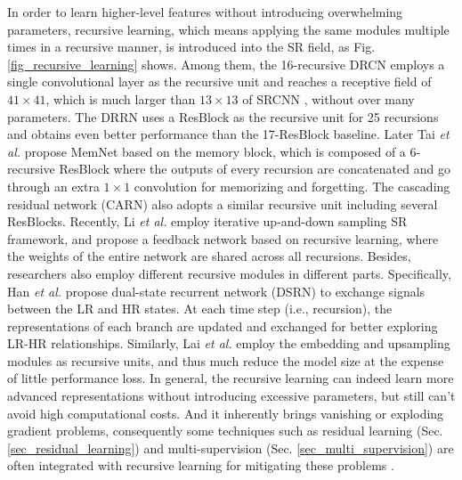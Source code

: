 {\label{sec_recursive_learning}
In order to learn higher-level features without introducing overwhelming parameters, recursive learning, which means applying the same modules multiple times in a recursive manner, is introduced into the SR field, as Fig. \ref{fig_recursive_learning} shows.
Among them, the 16-recursive DRCN employs a single convolutional layer as the recursive unit and reaches a receptive field of $41 \times 41$, which is much larger than $13 \times 13$ of SRCNN , without over many parameters.
The DRRN  uses a ResBlock  as the recursive unit for 25 recursions and obtains even better performance than the 17-ResBlock baseline.
Later Tai \textit{et al.}  propose MemNet based on the memory block, which is composed of a 6-recursive ResBlock where the outputs of every recursion are concatenated and go through an extra $1 \times 1$ convolution for memorizing and forgetting.
The cascading residual network (CARN)  also adopts a similar recursive unit including several ResBlocks.
Recently, Li \textit{et al.}  employ iterative up-and-down sampling SR framework, and propose a feedback network based on recursive learning, where the weights of the entire network are shared across all recursions.
Besides, researchers also employ different recursive modules in different parts.
Specifically, Han \textit{et al.}  propose dual-state recurrent network (DSRN) to exchange signals between the LR and HR states.
At each time step (i.e., recursion), the representations of each branch are updated and exchanged for better exploring LR-HR relationships.
Similarly, Lai \textit{et al.}  employ the embedding and upsampling modules as recursive units, and thus much reduce the model size at the expense of little performance loss.  
In general, the recursive learning can indeed learn more advanced representations without introducing excessive parameters, but still can't avoid high computational costs.
And it inherently brings vanishing or exploding gradient problems, consequently some techniques such as residual learning (Sec. \ref{sec_residual_learning}) and multi-supervision (Sec. \ref{sec_multi_supervision}) are often integrated with recursive learning for mitigating these problems .

}
